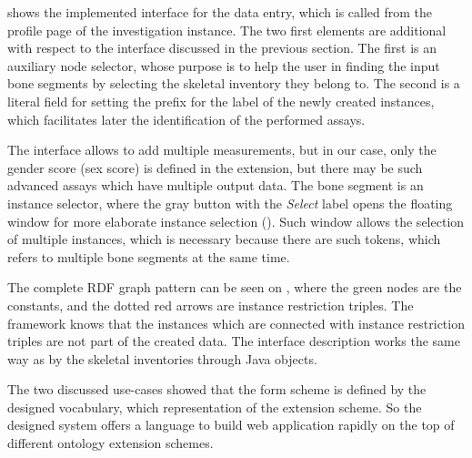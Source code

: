 
 shows the implemented interface for the data entry, which is called from the profile page of the investigation instance. The two first elements are additional with respect to the interface discussed in the previous section. The first is an auxiliary node selector, whose purpose is to help the user in finding the input bone segments by selecting the skeletal inventory they belong to. The second is a literal field for setting the prefix for the label of the newly created instances, which facilitates later the identification of the performed assays.


The interface allows to add multiple measurements, but in our case, only the gender score (sex score) is defined in the extension, but there may be such advanced assays which have multiple output data. The bone segment is an instance selector, where the gray button with the \textit{Select} label opens the floating window for more elaborate instance selection (). Such window allows the selection of multiple instances, which is necessary because there are such tokens, which refers to multiple bone segments at the same time.


The complete RDF graph pattern can be seen on , where the green nodes are the constants, and the dotted red arrows are instance restriction triples. The framework knows that the instances which are connected with instance restriction triples are not part of the created data. The interface description works the same way as by the skeletal inventories through Java objects.


The two discussed use-cases showed that the form scheme is defined by the designed vocabulary, which representation of the extension scheme. So the designed system offers a language to build web application rapidly on the top of different ontology extension schemes.

